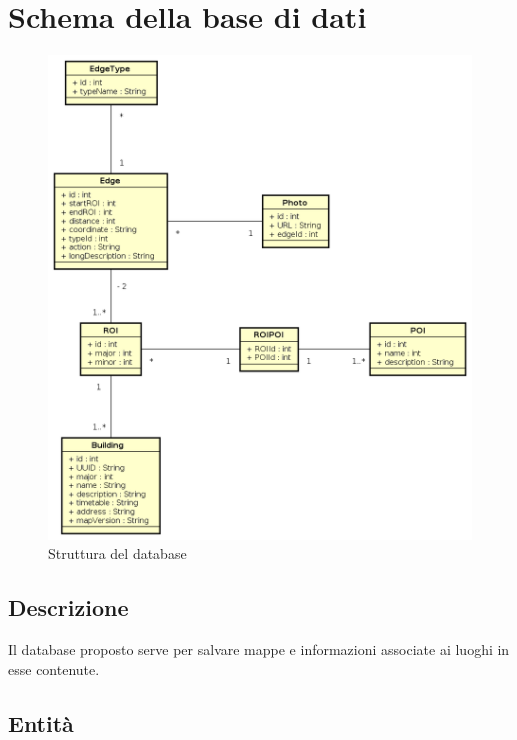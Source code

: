 \documentclass[../SpecificaTecnica.tex]{subfiles}
\begin{document}
\section{Schema della base di dati}
	\begin{figure}[!h]
		\centering
		\includegraphics[scale=0.6]{diagrammi/DatabaseSQL.png}
			\caption{Struttura del database}
		\label{fig:Struttura_MVP}
	\end{figure}
	\subsection{Descrizione}
		Il database proposto serve per salvare mappe e informazioni associate ai luoghi in esse contenute. 
	\subsection{Entità}
\end{document}
